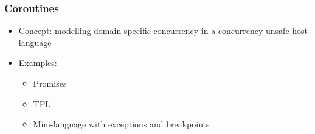 \documentclass{article}
\begin{document}
\subsubsection{Coroutines}\label{coroutines}

\begin{itemize}[noitemsep]

	\item
	Concept: modelling domain-specific concurrency in a concurrency-unsafe
	host-language
	\item
	Examples:
	
	\begin{itemize}[noitemsep]

		\item
		Promises
		\item
		TPL
		\item
		Mini-language with exceptions and breakpoints
	\end{itemize}
\end{itemize}
    
    
    
    
\end{document}
